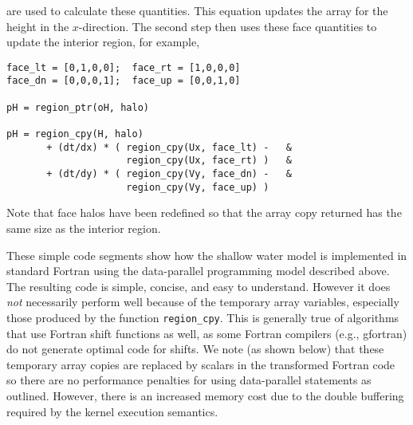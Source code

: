 \noindent
are used to calculate these quantities.  This equation updates the array for the
height in the $x$-direction.  The second step then uses these face quantities to
update the interior region, for example,

{\small
\begin{verbatim}
face_lt = [0,1,0,0];  face_rt = [1,0,0,0]
face_dn = [0,0,0,1];  face_up = [0,0,1,0]

pH = region_ptr(oH, halo)

pH = region_cpy(H, halo)
       + (dt/dx) * ( region_cpy(Ux, face_lt) -   &
                     region_cpy(Ux, face_rt) )   &
       + (dt/dy) * ( region_cpy(Vy, face_dn) -   &
                     region_cpy(Vy, face_up) )
\end{verbatim}
}

\noindent
Note that face halos have been redefined so that the array copy
returned has the same size as the interior region.

These simple code segments show how the shallow water model is implemented in
standard Fortran using the data-parallel programming model described above.  The
resulting code is simple, concise, and easy to understand.  However it does
\emph{not} necessarily perform well because of the temporary array variables,
especially those produced by the function {\tt region\_cpy}.  This is generally true
of algorithms that use Fortran shift functions as well, as some Fortran
compilers (e.g., gfortran) do not generate optimal code for shifts.  We note (as
shown below) that these temporary array copies are replaced by scalars in the
transformed Fortran code so there are no performance penalties for using
data-parallel statements as outlined.  However, there is an increased memory
cost due to the double buffering required by the kernel execution semantics.
